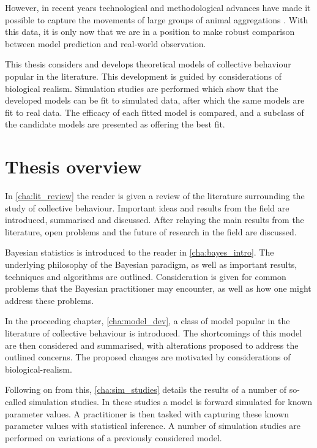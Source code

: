 However, in recent years technological and methodological advances have made it
possible to capture the movements of large groups of animal aggregations
\parencite{ballerini08}. With this data, it is only now that we are in a
position to make robust comparison between model prediction and real-world
observation.

This thesis considers and develops theoretical models of collective behaviour
popular in the literature. This development is guided by considerations of
biological realism. Simulation studies are performed which show that the
developed models can be fit to simulated data, after which the same models are
fit to real data. The efficacy of each fitted model is compared, and a subclass
of the candidate models are presented as offering the best fit.

\section{Thesis overview}
\label{sec:overview_of_thesis}

In \cref{cha:lit_review} the reader is given a review of the literature
surrounding the study of collective behaviour. Important ideas and results from
the field are introduced, summarised and discussed. After relaying the main
results from the literature, open problems and the future of research in the
field are discussed.

Bayesian statistics is introduced to the reader in \cref{cha:bayes_intro}. The
underlying philosophy of the Bayesian paradigm, as well as important results,
techniques and algorithms are outlined. Consideration is given for common
problems that the Bayesian practitioner may encounter, as well as how one might
address these problems.

In the proceeding chapter, \cref{cha:model_dev}, a class of model popular in
the literature of collective behaviour is introduced. The shortcomings of this
model are then considered and summarised, with alterations proposed to address
the outlined concerns. The proposed changes are motivated by considerations of
biological-realism.

Following on from this, \cref{cha:sim_studies} details the results of a number
of so-called simulation studies. In these studies a model is forward simulated
for known parameter values. A practitioner is then tasked with capturing these
known parameter values with statistical inference. A number of simulation
studies are performed on variations of a previously considered model.

